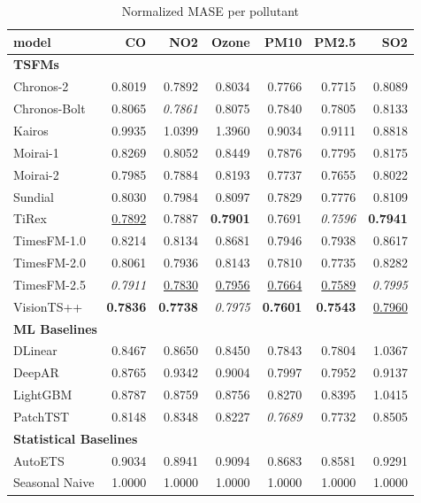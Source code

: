 \begin{table}[H]
\caption{Normalized MASE per pollutant}
\centering
\begin{small}
\begin{tabular}{lrrrrrr}
\toprule
model & CO & NO2 & Ozone & PM10 & PM2.5 & SO2 \\
\midrule
\multicolumn{7}{l}{\textbf{TSFMs}} \\
Chronos-2 & 0.8019 & 0.7892 & 0.8034 & 0.7766 & 0.7715 & 0.8089 \\
Chronos-Bolt & 0.8065 & \textit{0.7861} & 0.8075 & 0.7840 & 0.7805 & 0.8133 \\
Kairos & 0.9935 & 1.0399 & 1.3960 & 0.9034 & 0.9111 & 0.8818 \\
Moirai-1 & 0.8269 & 0.8052 & 0.8449 & 0.7876 & 0.7795 & 0.8175 \\
Moirai-2 & 0.7985 & 0.7884 & 0.8193 & 0.7737 & 0.7655 & 0.8022 \\
Sundial & 0.8030 & 0.7984 & 0.8097 & 0.7829 & 0.7776 & 0.8109 \\
TiRex & \underline{0.7892} & 0.7887 & \textbf{0.7901} & 0.7691 & \textit{0.7596} & \textbf{0.7941} \\
TimesFM-1.0 & 0.8214 & 0.8134 & 0.8681 & 0.7946 & 0.7938 & 0.8617 \\
TimesFM-2.0 & 0.8061 & 0.7936 & 0.8143 & 0.7810 & 0.7735 & 0.8282 \\
TimesFM-2.5 & \textit{0.7911} & \underline{0.7830} & \underline{0.7956} & \underline{0.7664} & \underline{0.7589} & \textit{0.7995} \\
VisionTS++ & \textbf{0.7836} & \textbf{0.7738} & \textit{0.7975} & \textbf{0.7601} & \textbf{0.7543} & \underline{0.7960} \\
\midrule
\multicolumn{7}{l}{\textbf{ML Baselines}} \\
DLinear & 0.8467 & 0.8650 & 0.8450 & 0.7843 & 0.7804 & 1.0367 \\
DeepAR & 0.8765 & 0.9342 & 0.9004 & 0.7997 & 0.7952 & 0.9137 \\
LightGBM & 0.8787 & 0.8759 & 0.8756 & 0.8270 & 0.8395 & 1.0415 \\
PatchTST & 0.8148 & 0.8348 & 0.8227 & \textit{0.7689} & 0.7732 & 0.8505 \\
\midrule
\multicolumn{7}{l}{\textbf{Statistical Baselines}} \\
AutoETS & 0.9034 & 0.8941 & 0.9094 & 0.8683 & 0.8581 & 0.9291 \\
Seasonal Naive & 1.0000 & 1.0000 & 1.0000 & 1.0000 & 1.0000 & 1.0000 \\
\bottomrule
\end{tabular}
\end{small}
\end{table}